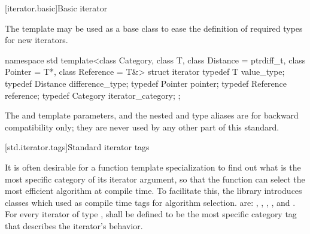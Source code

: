 [iterator.basic]{Basic iterator}

\pnum
The
template may be used as a base class to ease the definition of required types
for new iterators.

%
\begin{codeblock}
namespace std {
  template<class Category, class T, class Distance = ptrdiff_t,
    class Pointer = T*, class Reference = T&>
  struct iterator {
    typedef T         value_type;
    typedef Distance  difference_type;
    typedef Pointer   pointer;
    typedef Reference reference;
    typedef Category  iterator_category;
  };
}
\end{codeblock}

\begin{addedblock}
\pnum
\enternote The  and  template parameters, and the nested 
and  type aliases are for backward compatibility only; they are never used by any
other part of this standard.\exitnote
\end{addedblock}

[std.iterator.tags]{Standard iterator tags}

\pnum
{}%
%
%
%
%
%
It is often desirable for a
function template specialization
to find out what is the most specific category of its iterator
argument, so that the function can select the most efficient algorithm at compile time.
To facilitate this, the
library introduces
classes which  used as compile time tags for algorithm selection.
 are:
,
,
,
,
and
.
For every iterator of type
,
shall be defined to be the most specific category tag that describes the
iterator's behavior.

